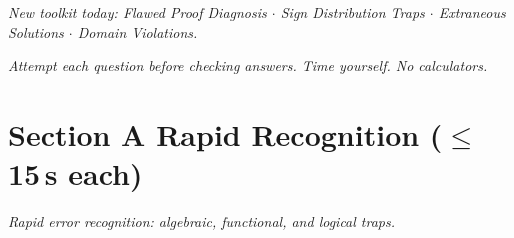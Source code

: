 \documentclass[11pt,a4paper]{article}
\begin{document}
\noindent\textit{New toolkit today: Flawed Proof Diagnosis $\cdot$ Sign Distribution Traps $\cdot$ Extraneous Solutions $\cdot$ Domain Violations.}

\vspace{2pt}
\noindent\textit{Attempt each question before checking answers. Time yourself. No calculators.}

\section*{Section A \quad Rapid Recognition \hfill{\normalfont\small($\leq$15\,s each)}}

\noindent\textit{Rapid error recognition: algebraic, functional, and logical traps.}
\end{document}
